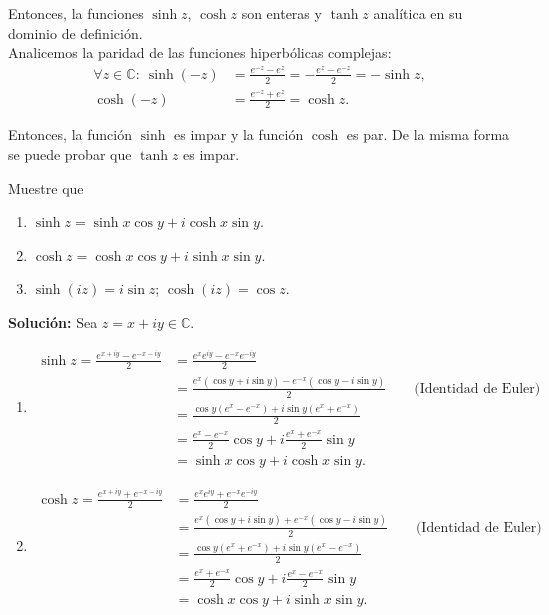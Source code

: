 Entonces, la funciones $\sinh z$, $\cosh z$ son enteras y $\tanh z$ analítica en su dominio de definición.
\\

Analicemos la paridad de las funciones hiperbólicas complejas:
\begin{align*}
\forall z \in \mathbb{C}:~ \sinh(-z) &= \frac{e^{-z} - e^{z}}{2} = - \frac{ e^{z} - e^{-z} }{2} = - \sinh z , \\
\cosh(-z) &= \frac{e^{-z} + e^{z}}{2} =  \cosh z.
\end{align*}

Entonces, la función $\sinh$  es impar y la función $\cosh$ es par. De la misma forma se puede probar que $\tanh z$ es impar.

\begin{ejemplo}\label{PropiedadesHiper}
Muestre que 

\begin{enumerate}
\item $\sinh z = \sinh x \cos y + i \cosh x \sin y$.

\item $\cosh z = \cosh x \cos y + i \sinh x \sin y$.

\item $\sinh(iz) = i \sin z$; $\cosh(iz) = \cos z$. 
\end{enumerate}

\textbf{Solución:} Sea $z = x + iy \in \mathbb{C}$.

\begin{enumerate}
\item 
\begin{align*}
\sinh z =\frac{e^{x+iy} - e^{-x-iy}}{2} 
&= \frac{e^{x} e^{iy} - e^{-x} e^{-iy}}{2} \\
&= \frac{e^{x}(\cos y + i \sin y) - e^{-x} (\cos y - i \sin y)}{2} \qquad \mbox{(Identidad de Euler)}\\
&= \frac{\cos y (e^{x} - e^{-x}) + i \sin y (e^{x} + e^{-x})}{2} \\
&=  \frac{e^x - e^{-x}}{2} \cos y + i  \frac{e^x+e^{-x}}{2} \sin y \\
&= \sinh x \cos y + i \cosh x \sin y.
\end{align*}

\item 
\begin{align*}
\cosh z =\frac{e^{x+iy} + e^{-x-iy}}{2} 
&= \frac{e^{x} e^{iy} + e^{-x} e^{-iy}}{2} \\
&= \frac{e^{x}(\cos y + i \sin y) + e^{-x} (\cos y - i \sin y)}{2} \qquad \mbox{(Identidad de Euler)}\\
&= \frac{\cos y (e^{x} + e^{-x}) + i \sin y (e^{x} - e^{-x})}{2} \\
&=  \frac{e^x + e^{-x}}{2} \cos y + i  \frac{e^x-e^{-x}}{2} \sin y \\
&= \cosh x \cos y + i \sinh x \sin y.
\end{align*}


\end{enumerate}
\end{ejemplo}
